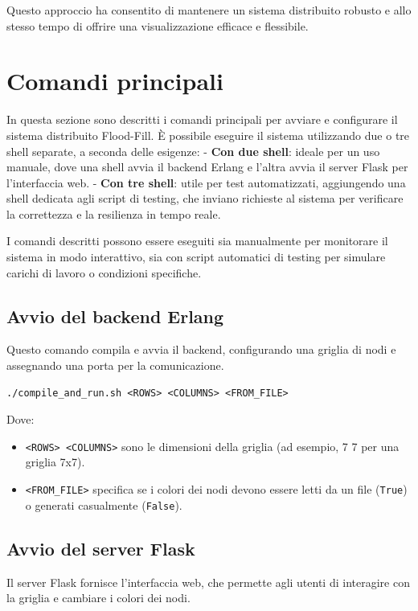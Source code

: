 \documentclass[12pt, a4paper]{report}
\begin{document}
Questo approccio ha consentito di mantenere un sistema distribuito robusto e allo stesso tempo di offrire una visualizzazione efficace e flessibile.

\section{Comandi principali}

In questa sezione sono descritti i comandi principali per avviare e configurare il sistema distribuito Flood-Fill. È possibile eseguire il sistema utilizzando due o tre shell separate, a seconda delle esigenze:
- \textbf{Con due shell}: ideale per un uso manuale, dove una shell avvia il backend Erlang e l’altra avvia il server Flask per l’interfaccia web.
- \textbf{Con tre shell}: utile per test automatizzati, aggiungendo una shell dedicata agli script di testing, che inviano richieste al sistema per verificare la correttezza e la resilienza in tempo reale.

I comandi descritti possono essere eseguiti sia manualmente per monitorare il sistema in modo interattivo, sia con script automatici di testing per simulare carichi di lavoro o condizioni specifiche.

\subsection{Avvio del backend Erlang}
Questo comando compila e avvia il backend, configurando una griglia di nodi e assegnando una porta per la comunicazione. 

\begin{tcolorbox}[title=Comandi di avvio in Erlang]
\begin{verbatim}
./compile_and_run.sh <ROWS> <COLUMNS> <FROM_FILE>
\end{verbatim}
\end{tcolorbox}

\noindent Dove:
\begin{itemize}
\item \texttt{<ROWS> <COLUMNS>} sono le dimensioni della griglia (ad esempio, 7 7 per una griglia 7x7).
\item \texttt{<FROM\_FILE>} specifica se i colori dei nodi devono essere letti da un file (\texttt{True}) o generati casualmente (\texttt{False}).
\end{itemize}

\subsection{Avvio del server Flask}
Il server Flask fornisce l’interfaccia web, che permette agli utenti di interagire con la griglia e cambiare i colori dei nodi.
\end{document}
